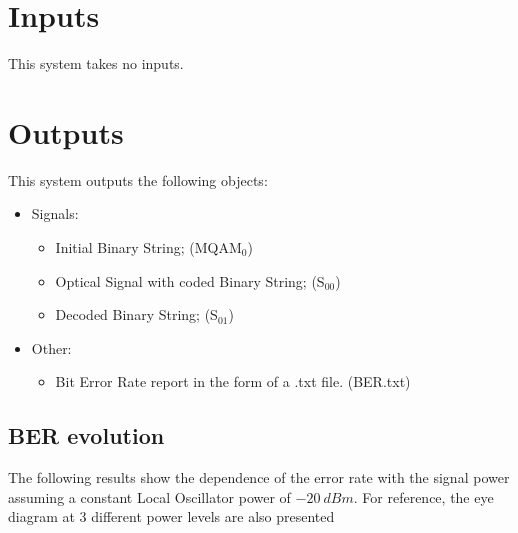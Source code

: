 \documentclass[a4paper]{article}
\begin{document}

\section{Inputs}

This system takes no inputs.

\section{Outputs}

This system outputs the following objects:
\begin{itemize}
\item Signals:
\begin{itemize}
\item Initial Binary String; (MQAM$_0$)
\item Optical Signal with coded Binary String; (S$_{00}$)
\item Decoded Binary String; (S$_{01}$)
\end{itemize}
\item Other:
\begin{itemize}
\item Bit Error Rate report in the form of a .txt file. (BER.txt)
\end{itemize}
\end{itemize}

\subsection{BER evolution}

The following results show the dependence of the error rate with the signal power assuming a constant Local Oscillator power of $-20~dBm$. For reference, the eye diagram at 3 different power levels are also presented
\end{document}
